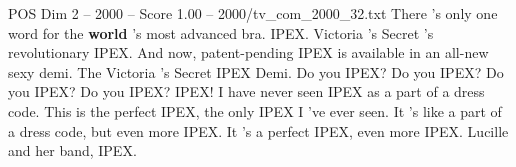 \begin{textsample}{POS Dim 2 – 2000 – Score 1.00 – 2000/tv\_com\_2000\_32.txt}  \label{ex:f2_pos_083}
There 's only one word for the \textbf{world} 's most advanced bra.
IPEX.
Victoria 's Secret 's revolutionary IPEX.
And now, patent-pending IPEX is available in an all-new sexy demi.
The Victoria 's Secret IPEX Demi.
Do you IPEX?
Do you IPEX?
Do you IPEX?
Do you IPEX?
IPEX!
I have never seen IPEX as a part of a dress code.
This is the perfect IPEX, the only IPEX I 've ever seen.
It 's like a part of a dress code, but even more IPEX.
It 's a perfect IPEX, even more IPEX.
Lucille and her band, IPEX.

\end{textsample}
